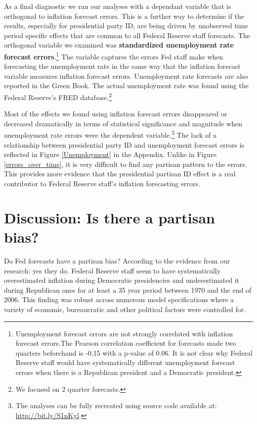 \documentclass[a4paper]{article}\usepackage{graphicx, color}
\begin{document}
As a final diagnostic we ran our analyses with a dependant variable that is orthogonal to inflation forecast errors. This is a further way to determine if the results, especially for presidential party ID, are being driven by unobserved time period specific effects that are common to all Federal Reserve staff forecasts. The orthogonal variable we examined was {\bf{standardized unemployment rate forecast errors}}.\footnote{Unemployment forecast errors are not strongly correlated with inflation forecast errors.The Pearson correlation coefficient for forecasts made two quarters beforehand is -0.15 with a p-value of 0.06. It is not clear why Federal Reserve staff would have systematically different unemployment forecast errors when there is a Republican president and a Democratic president.} The variable captures the errors Fed staff make when forecasting the unemployment rate in the same way that the inflation forecast variable measures inflation forecast errors. Unemployment rate forecasts are also reported in the Green Book. The actual unemployment rate was found using the Federal Reserve's FRED database.\footnote{We focused on 2 quarter forecasts.}

Most of the effects we found using inflation forecast errors disappeared or decreased dramatically in terms of statistical significance and magnitude when unemployment rate errors were the dependent variable.\footnote{The analyses can be fully recreated using source code available at: \url{http://bit.ly/S1nKyl}.} The lack of a relationship between presidential party ID and unemployment forecast errors is reflected in Figure \ref{Unemployment} in the Appendix. Unlike in Figure \ref{errors_over_time}, it is very difficult to find any partisan pattern to the errors. This provides more evidence that the presidential partisan ID effect is a real contributor to Federal Reserve staff's inflation forecasting errors.

\section*{Discussion: Is there a partisan bias?}

Do Fed forecasts have a partisan bias? According to the evidence from our research: yes they do. Federal Reserve staff seem to have systematically overestimated inflation during Democratic presidencies and underestimated it during Republican ones for at least a 35 year period between 1970 and the end of 2006. This finding was robust across numerous model specifications where a variety of economic, bureaucratic and other political factors were controlled for. 
\end{document}
